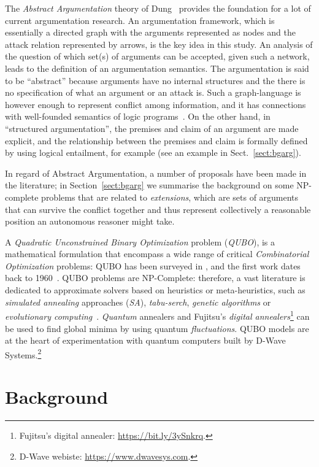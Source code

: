 \documentclass[conference]{IEEEtran}
\begin{document}
The \emph{Abstract Argumentation} theory of Dung~\cite{Dung:1995} provides the foundation for a lot of current argumentation research. An argumentation framework, which is essentially a directed graph with the arguments represented as nodes and the attack relation represented by arrows, is the key idea in this study. An analysis of the question of which set(s) of arguments can be accepted, given such a network, leads to the definition of an argumentation semantics. 
The argumentation is said to be ``abstract'' because arguments have no internal structures and the there is no specification of what an argument or an attack is. Such a graph-language is however enough to represent conflict among information, and it has connections with well-founded semantics of logic programs~\cite{wellfounded}.
On the  other hand, in ``structured argumentation'',  the premises and claim of an argument are made explicit, and the relationship between the premises and claim is formally defined by using logical entailment, for example (see an example in Sect.~\ref{sect:bgarg}).

In regard of Abstract Argumentation, a number of proposals have been made in the literature; in Section~\ref{sect:bgarg} we summarise the background on  some NP-complete problems  that are related to \emph{extensions}, which are sets of arguments that can survive the conflict together and thus represent collectively a reasonable position an autonomous reasoner might take. 


A \emph{Quadratic Unconstrained Binary Optimization} problem (\emph{QUBO}),  is a mathematical formulation that  encompass a wide range of critical \emph{Combinatorial Optimization} problems: QUBO has been surveyed in \cite{survey2,survey1}, and the first work dates back to 1960~\cite{firstworkqubo}.  QUBO problems are  NP-Complete: therefore, a vast literature is dedicated to approximate solvers  based on heuristics or meta-heuristics, such as  \emph{simulated annealing} approaches (\emph{SA}), \emph{tabu-serch}, \emph{genetic algorithms} or \emph{evolutionary computing}~\cite{survey1}. \emph{Quantum} annealers  and Fujitsu's \emph{digital annealers}\footnote{Fujitsu's digital annealer: \url{https://bit.ly/3ySnkrq}.} can be used to find global minima by using quantum \emph{fluctuations}.  QUBO models are  at the heart of experimentation with quantum computers built by D-Wave Systems.\footnote{D-Wave webiste: \url{https://www.dwavesys.com}.}

\section{Background}\label{sect:background}
\end{document}
